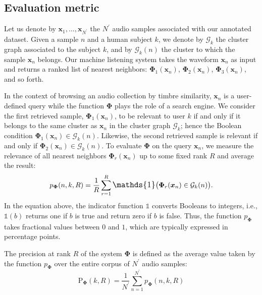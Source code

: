 \documentclass{bmcart}
\begin{document}
\subsection*{Evaluation metric}

Let us denote by $\boldsymbol{x}_1, \ldots, \boldsymbol{x}_{{N}^{\prime}}$ the $N^{\prime}$ audio samples associated with our annotated dataset.
Given a sample $n$ and a human subject $k$, we denote by $\mathcal{G}_k$ the cluster graph associated to the subject $k$, and by $\mathcal{G}_k (n)$ the cluster to which the sample $\boldsymbol{x}_{n}$ belongs.
Our machine listening system takes the waveform $\boldsymbol{x}_{n}$ as input and returns a ranked list of nearest neighbors: $\mathbf{\Phi}_1 (\boldsymbol{x}_n)$, $\mathbf{\Phi}_2 (\boldsymbol{x}_n)$, $\mathbf{\Phi}_3 (\boldsymbol{x}_n)$, and so forth.

In the context of browsing an audio collection by timbre similarity, $\boldsymbol{x}_n$ is a user-defined query while the function $\mathbf{\Phi}$ plays the role of a search engine.
We consider the first retrieved sample, $\mathbf{\Phi}_1 (\boldsymbol{x}_n)$, to be relevant to user $k$ if and only if it belongs to the same cluster as $\boldsymbol{x}_n$ in the cluster graph $\mathcal{G}_k$; hence the Boolean condition $\mathbf{\Phi}_{1}(\boldsymbol{x}_{n}) \in \mathcal{G}_k (n)$.
Likewise, the second retrieved sample is relevant if and only if $\mathbf{\Phi}_{2}(\boldsymbol{x}_{n}) \in \mathcal{G}_k (n)$.
To evaluate $\mathbf{\Phi}$ on the query $\boldsymbol{x}_n$, we measure the relevance of all nearest neighbors $\mathbf{\Phi}_r (\boldsymbol{x}_n)$ up to some fixed rank $R$ and average the result:
\begin{equation}
p_{\mathbf{\Phi}}(n, k, R) =
    \dfrac{1}{R}
    \sum_{r=1}^{R}
    \mathlarger{\mathds{1}}
    \big(
        \mathbf{\Phi}_r(\boldsymbol{x}_n)
        \in
        \mathcal{G}_k (n)
    \big).
\end{equation}
In the equation above, the indicator function $\mathds{1}$ converts Booleans to integers, i.e., $\mathds{1}(b)$ returns one if $b$ is true and return zero if $b$ is false.
Thus, the function $p_{\mathbf{\Phi}}$ takes fractional values between $0$ and $1$, which are typically expressed in percentage points.

The precision at rank $R$ of the system $\mathbf{\Phi}$ is defined as the average value taken by the function $p_{\mathbf{\Phi}}$ over the entire corpus of $N^{\prime}$ audio samples:
\begin{equation}
\mathrm{P}_{\mathbf{\Phi}}(k, R) =
\dfrac{1}{N^{\prime}}
\sum_{n=1}^{N^{\prime}}
p_{\mathbf{\Phi}}(n, k, R)
\end{equation}
\end{document}
